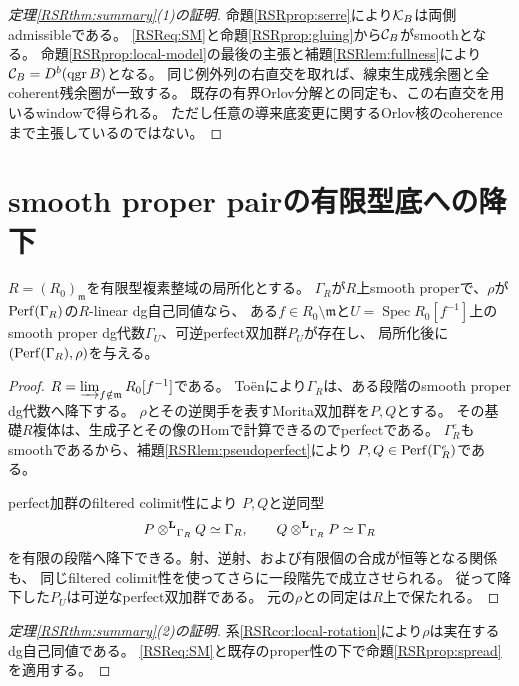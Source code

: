 \begin{proof}[定理\ref{RSRthm:summary}(1)の証明]
命題\ref{RSRprop:serre}により$\mathcal K_B$は両側admissibleである。
\eqref{RSReq:SM}と命題\ref{RSRprop:gluing}から$\mathcal C_B$がsmoothとなる。
命題\ref{RSRprop:local-model}の最後の主張と補題\ref{RSRlem:fullness}により
$\mathcal C_B=D^b(\operatorname{qgr} B)$となる。
同じ例外列の右直交を取れば、線束生成残余圏と全coherent残余圏が一致する。
既存の有界Orlov分解との同定も、この右直交を用いるwindowで得られる。
ただし任意の導来底変更に関するOrlov核のcoherenceまで主張しているのではない。
\end{proof}

\section{smooth proper pairの有限型底への降下}\label{RSRsec:spread}
\begin{proposition}[局所pairのspread]\label{RSRprop:spread}
$R=(R_0)_{\mathfrak m}$を有限型複素整域の局所化とする。
$\Gamma_R$が$R$上smooth properで、$\rho$が$\operatorname{Perf}(\Gamma_R)$の$R$-linear dg自己同値なら、
ある$f\in R_0\setminus\mathfrak m$と$U=\operatorname{Spec}R_0[f^{-1}]$上の
smooth proper dg代数$\Gamma_U$、可逆perfect双加群$P_U$が存在し、
局所化後に$(\operatorname{Perf}(\Gamma_R),\rho)$を与える。
\end{proposition}
\begin{proof}
$R=\varinjlim_{f\notin\mathfrak m}R_0[f^{-1}]$である。
Toën\cite[Théorème 1]{RSRToen}により$\Gamma_R$は、ある段階のsmooth proper dg代数へ降下する。
$\rho$とその逆関手を表すMorita双加群を$P,Q$とする。
その基礎$R$複体は、生成子とその像のHomで計算できるのでperfectである。
$\Gamma_R^e$もsmoothであるから、補題\ref{RSRlem:pseudoperfect}により
$P,Q\in\operatorname{Perf}(\Gamma_R^e)$である。

perfect加群のfiltered colimit性\cite[F4]{RSRToen}\cite[Lemma 2.10]{RSRTV}により
$P,Q$と逆同型
\[
 P\mathbin{\otimes^{\mathbf L}}_{\Gamma_R}Q\simeq\Gamma_R,
 \qquad Q\mathbin{\otimes^{\mathbf L}}_{\Gamma_R}P\simeq\Gamma_R
\]
を有限の段階へ降下できる。射、逆射、および有限個の合成が恒等となる関係も、
同じfiltered colimit性を使ってさらに一段階先で成立させられる。
従って降下した$P_U$は可逆なperfect双加群である。
元の$\rho$との同定は$R$上で保たれる。
\end{proof}

\begin{proof}[定理\ref{RSRthm:summary}(2)の証明]
系\ref{RSRcor:local-rotation}により$\rho$は実在するdg自己同値である。
\eqref{RSReq:SM}と既存のproper性の下で命題\ref{RSRprop:spread}を適用する。
\end{proof}

